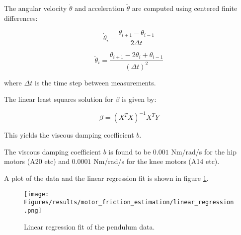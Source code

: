 The angular velocity \( \dot{\theta} \) and acceleration \( \ddot{\theta} \) are computed using centered finite differences:

\[
\dot{\theta}_i = \frac{\theta_{i+1} - \theta_{i-1}}{2\Delta t}
\]

\[
\ddot{\theta}_i = \frac{\theta_{i+1} - 2\theta_i + \theta_{i-1}}{(\Delta t)^2}
\]

where \(\Delta t\) is the time step between measurements.

The linear least squares solution for \( \beta \) is given by:

\[
\beta = (X^T X)^{-1} X^T Y
\]

This yields the viscous damping coefficient \( b \).

The viscous damping coefficient \( b \) is found to be \( 0.001 \) Nm/rad/s for the hip motors (A20 etc) and \( 0.0001 \) Nm/rad/s for the knee motors (A14 etc).

A plot of the data and the linear regression fit is shown in figure \ref{fig:results:motor_friction_estimation:linear_regression}.

\begin{figure}[h]
    \centering
    \texttt{[image: Figures/results/motor\_friction\_estimation/linear\_regression.png]}
    \caption{Linear regression fit of the pendulum data.}
    \label{fig:results:motor_friction_estimation:linear_regression}
\end{figure}